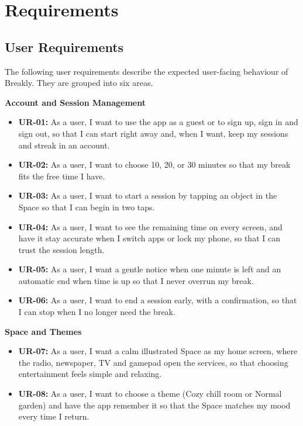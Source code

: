 \section{Requirements}
\label{sec:requirements}

\subsection{User Requirements}
\label{sec:user-requirements}

The following user requirements describe the expected user-facing behaviour of
Breakly. They are grouped into six areas.

\medskip\noindent\textbf{Account and Session Management}\par\nopagebreak
\begin{itemize}
  \item \textbf{UR-01:} As a user, I want to use the app as a guest or to sign
        up, sign in and sign out, so that I can start right away and, when I
        want, keep my sessions and streak in an account.
  \item \textbf{UR-02:} As a user, I want to choose 10, 20, or 30 minutes so
        that my break fits the free time I have.
  \item \textbf{UR-03:} As a user, I want to start a session by tapping an
        object in the Space so that I can begin in two taps.
  \item \textbf{UR-04:} As a user, I want to see the remaining time on every
        screen, and have it stay accurate when I switch apps or lock my phone,
        so that I can trust the session length.
  \item \textbf{UR-05:} As a user, I want a gentle notice when one minute is
        left and an automatic end when time is up so that I never overrun my
        break.
  \item \textbf{UR-06:} As a user, I want to end a session early, with a
        confirmation, so that I can stop when I no longer need the break.
\end{itemize}

\medskip\noindent\textbf{Space and Themes}\par\nopagebreak
\begin{itemize}
  \item \textbf{UR-07:} As a user, I want a calm illustrated Space as my home
        screen, where the radio, newspaper, TV and gamepad open the services,
        so that choosing entertainment feels simple and relaxing.
  \item \textbf{UR-08:} As a user, I want to choose a theme (Cozy chill room or
        Normal garden) and have the app remember it so that the Space matches
        my mood every time I return.
\end{itemize}

